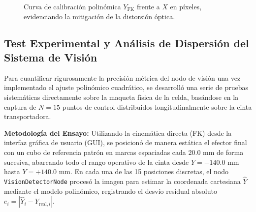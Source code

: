 \documentclass[12pt, a4paper]{report}
\begin{document}
\begin{figure}[H]
\centering
{}
\caption{Curva de calibración polinómica $Y_{\text{FK}}$ frente a $X$ en píxeles, evidenciando la mitigación de la distorsión óptica.}
\label{fig:curva_calibracion_experimental}
\end{figure}

\subsection{Test Experimental y Análisis de Dispersión del Sistema de Visión}
Para cuantificar rigurosamente la precisión métrica del nodo de visión una vez implementado el ajuste polinómico cuadrático, se desarrolló una serie de pruebas sistemáticas directamente sobre la maqueta física de la celda, basándose en la captura de $N = 15$ puntos de control distribuidos longitudinalmente sobre la cinta transportadora.

\textbf{Metodología del Ensayo:} Utilizando la cinemática directa (FK) desde la interfaz gráfica de usuario (GUI), se posicionó de manera estática el efector final con un cubo de referencia patrón en marcas espaciadas cada $20.0\text{ mm}$ de forma sucesiva, abarcando todo el rango operativo de la cinta desde $Y = -140.0\text{ mm}$ hasta $Y = +140.0\text{ mm}$. En cada una de las 15 posiciones discretas, el nodo \texttt{VisionDetectorNode} procesó la imagen para estimar la coordenada cartesiana $\hat{Y}$ mediante el modelo polinómico, registrando el desvío residual absoluto $e_i = |\hat{Y}_i - Y_{\text{real}, i}|$.
\end{document}
